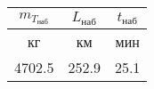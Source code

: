 \begin{tabular}{|c|c|c|}
\hline
$m_{T_{наб}}$ & $L_{наб}$ & $t_{наб}$ \\ 
\hline
кг & км & мин \\ 
\hline
4702.5 & 252.9 & 25.1 \\ 
\hline
\end{tabular}